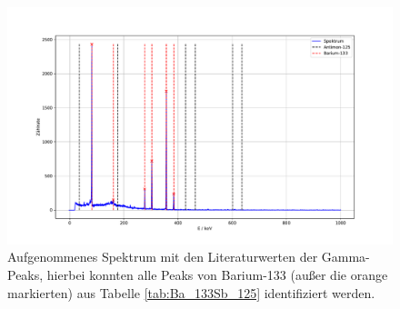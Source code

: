 \begin{figure}
  \centering
  \includegraphics[width = \textwidth, keepaspectratio]{figure/03_peaks.pdf}
  \caption{Aufgenommenes Spektrum mit den Literaturwerten der Gamma-Peaks, hierbei konnten alle Peaks von Barium-133 (außer die orange markierten) aus Tabelle \ref{tab:Ba_133Sb_125} identifiziert werden.}
\end{figure}